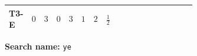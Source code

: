 \documentclass[8pt]{article}
\begin{document}
\begin{landscape}
\begin{longtable}{@{}llcccccc >{\raggedright\arraybackslash}p{0.21\linewidth} >{\raggedright\arraybackslash}p{0.21\linewidth} >{\raggedright\arraybackslash}p{0.21\linewidth}@{}}
\midrule
T3-E & $0$ & $3$ & $0$ & $3$ & $1$ & $2$ & $\frac{1}{2}$ & \scriptsize\adjustbox{max width=\linewidth}{$\begin{gathered} 3 \operatorname{Tr}\!\left({Y_d}\,\left({Y_d}\right)^{\dagger}\right) \left({Y_e}\right)_{ij}\end{gathered}$} & \scriptsize\adjustbox{max width=\linewidth}{$\begin{gathered} +3 \operatorname{Tr}\!\left({Y_u}\,\left({Y_u}\right)^{\dagger}\right) \left({Y_e}\right)_{ij}\end{gathered}$} & \scriptsize\adjustbox{max width=\linewidth}{$\begin{gathered} +\operatorname{Tr}\!\left({Y_e}\,\left({Y_e}\right)^{\dagger}\right) \left({Y_e}\right)_{ij}\end{gathered}$} \\
\midrule
\bottomrule
\end{longtable}
\clearpage
\noindent\textbf{Search name: }\texttt{ye}\par\smallskip

\end{landscape}
\end{document}
